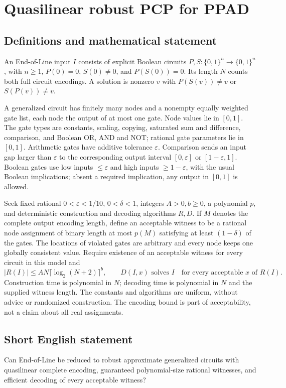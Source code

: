 \documentclass[11pt]{article}
\begin{document}
\section*{Quasilinear robust PCP for PPAD}\label{statement}
\subsection{Definitions and mathematical statement}
An End-of-Line input $I$ consists of explicit Boolean circuits $P,S:\{0,1\}^n\to\{0,1\}^n$, with $n\ge1$, $P(0)=0$, $S(0)\ne0$, and $P(S(0))=0$. Its length $N$ counts both full circuit encodings. A solution is nonzero $v$ with $P(S(v))\ne v$ or $S(P(v))\ne v$.

A generalized circuit has finitely many nodes and a nonempty equally weighted gate list, each node the output of at most one gate. Node values lie in $[0,1]$. The gate types are constants, scaling, copying, saturated sum and difference, comparison, and Boolean OR, AND and NOT; rational gate parameters lie in $[0,1]$. Arithmetic gates have additive tolerance $\varepsilon$. Comparison sends an input gap larger than $\varepsilon$ to the corresponding output interval $[0,\varepsilon]$ or $[1-\varepsilon,1]$. Boolean gates use low inputs $\le\varepsilon$ and high inputs $\ge1-\varepsilon$, with the usual Boolean implications; absent a required implication, any output in $[0,1]$ is allowed.

Seek fixed rational $0<\varepsilon<1/10$, $0<\delta<1$, integers $A>0,b\ge0$, a polynomial $p$, and deterministic construction and decoding algorithms $R,D$. If $M$ denotes the complete output encoding length, define an acceptable witness to be a rational node assignment of binary length at most $p(M)$ satisfying at least $(1-\delta)$ of the gates. The locations of violated gates are arbitrary and every node keeps one globally consistent value. Require existence of an acceptable witness for every circuit in this model and
\[
 |R(I)|\le AN\lceil\log_2(N+2)\rceil^b,\qquad
 D(I,x)\text{ solves }I\quad\text{for every acceptable }x\text{ of }R(I).
\]
Construction time is polynomial in $N$; decoding time is polynomial in $N$ and the supplied witness length. The constants and algorithms are uniform, without advice or randomized construction. The encoding bound is part of acceptability, not a claim about all real assignments.

\subsection{Short English statement}
Can End-of-Line be reduced to robust approximate generalized circuits with quasilinear complete encoding, guaranteed polynomial-size rational witnesses, and efficient decoding of every acceptable witness?
\end{document}
